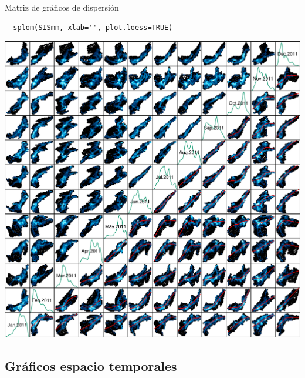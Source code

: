\documentclass[xcolor={usenames,svgnames,dvipsnames}]{beamer}
\begin{document}
\begin{frame}[fragile,label=sec-4-3-3]{Matriz de gráficos de dispersión}
 \lstset{language=R,label= ,caption= ,numbers=none}
\begin{lstlisting}
  splom(SISmm, xlab='', plot.loess=TRUE)
\end{lstlisting}

\includegraphics[width=.9\linewidth]{figs/SISmm_splom.png}
\end{frame}


\subsection{Gráficos espacio temporales}
\label{sec-4-4}
\end{document}
